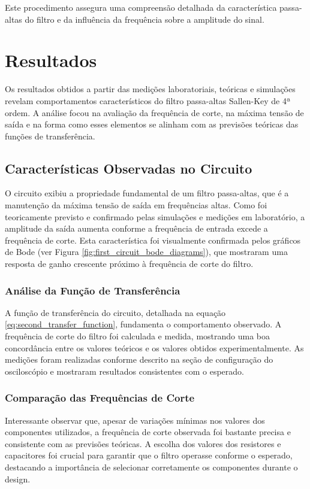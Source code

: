 \documentclass[
	12pt,				%
	openright,			%
	twoside,			%
	a4paper,			%
	english,			%
	french,				%
	spanish,			%
	brazil,				%
	]{abntex2}
\begin{document}
Este procedimento assegura uma compreensão detalhada da característica passa-altas do filtro e da influência da frequência sobre a amplitude do sinal.


\pagebreak
\chapter{Resultados}

Os resultados obtidos a partir das medições laboratoriais, teóricas e simulações revelam comportamentos característicos do filtro passa-altas Sallen-Key de 4ª ordem. A análise focou na avaliação da frequência de corte, na máxima tensão de saída e na forma como esses elementos se alinham com as previsões teóricas das funções de transferência.

\section{Características Observadas no Circuito}

O circuito exibiu a propriedade fundamental de um filtro passa-altas, que é a manutenção da máxima tensão de saída em frequências altas. Como foi teoricamente previsto e confirmado pelas simulações e medições em laboratório, a amplitude da saída aumenta conforme a frequência de entrada excede a frequência de corte. Esta característica foi visualmente confirmada pelos gráficos de Bode (ver Figura \ref{fig:first_circuit_bode_diagrams}), que mostraram uma resposta de ganho crescente próximo à frequência de corte do filtro.

\subsection{Análise da Função de Transferência}

A função de transferência do circuito, detalhada na equação \ref{eq:second_transfer_function}, fundamenta o comportamento observado. A frequência de corte do filtro foi calculada e medida, mostrando uma boa concordância entre os valores teóricos e os valores obtidos experimentalmente. As medições foram realizadas conforme descrito na seção de configuração do osciloscópio e mostraram resultados consistentes com o esperado.

\subsection{Comparação das Frequências de Corte}

Interessante observar que, apesar de variações mínimas nos valores dos componentes utilizados, a frequência de corte observada foi bastante precisa e consistente com as previsões teóricas. A escolha dos valores dos resistores e capacitores foi crucial para garantir que o filtro operasse conforme o esperado, destacando a importância de selecionar corretamente os componentes durante o design.
\end{document}
